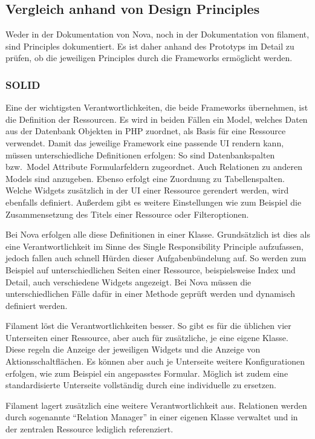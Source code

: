 \subsection{Vergleich anhand von Design Principles}
Weder in der Dokumentation von Nova, noch in der Dokumentation von filament, sind Principles dokumentiert.
Es ist daher anhand des Prototyps im Detail zu prüfen, ob die jeweiligen Principles durch die Frameworks ermöglicht werden.

\subsubsection{SOLID}
Eine der wichtigsten Verantwortlichkeiten, die beide Frameworks übernehmen, ist die Definition der Ressourcen.
Es wird in beiden Fällen ein Model, welches Daten aus der Datenbank Objekten in PHP zuordnet, als Basis für eine Ressource verwendet.
Damit das jeweilige Framework eine passende UI rendern kann, müssen unterschiedliche Definitionen erfolgen:
So sind Datenbankspalten bzw.\ Model Attribute Formularfeldern zugeordnet.
Auch Relationen zu anderen Models sind anzugeben.
Ebenso erfolgt eine Zuordnung zu Tabellenspalten.
Welche Widgets zusätzlich in der UI einer Ressource gerendert werden, wird ebenfalls definiert.
Außerdem gibt es weitere Einstellungen wie zum Beispiel die Zusammensetzung des Titels einer Ressource oder Filteroptionen.

Bei Nova erfolgen alle diese Definitionen in einer Klasse.
Grundsätzlich ist dies als eine Verantwortlichkeit im Sinne des Single Responsibility Principle aufzufassen, jedoch fallen auch schnell Hürden dieser Aufgabenbündelung auf.
So werden zum Beispiel auf unterschiedlichen Seiten einer Ressource, beispielsweise Index und Detail, auch verschiedene Widgets angezeigt.
Bei Nova müssen die unterschiedlichen Fälle dafür in einer Methode geprüft werden und dynamisch definiert werden.

Filament löst die Verantwortlichkeiten besser.
So gibt es für die üblichen vier Unterseiten einer Ressource, aber auch für zusätzliche, je eine eigene Klasse.
Diese regeln die Anzeige der jeweiligen Widgets und die Anzeige von Aktionsschaltflächen.
Es können aber auch je Unterseite weitere Konfigurationen erfolgen, wie zum Beispiel ein angepasstes Formular.
Möglich ist zudem eine standardisierte Unterseite vollständig durch eine individuelle zu ersetzen.

Filament lagert zusätzlich eine weitere Verantwortlichkeit aus.
Relationen werden durch sogenannte \enquote{Relation Manager} in einer eigenen Klasse verwaltet und in der zentralen Ressource lediglich referenziert.

